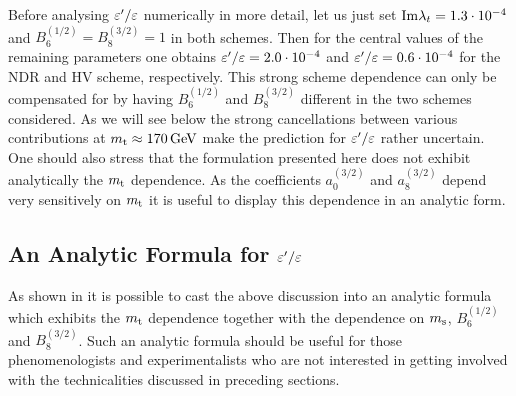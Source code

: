 Before analysing $\varepsilon'/\varepsilon$ numerically in more detail, let us just set
${\rm Im} \lambda_t = 1.3 \cdot 10^{-4}$ and $B_6^{(1/2)} = B_8^{(3/2)} = 1$
in both schemes. Then for the central values of the remaining
parameters one obtains $\varepsilon'/\varepsilon = 2.0 \cdot 10^{-4}$ and $\varepsilon'/\varepsilon = 0.6 \cdot
10^{-4}$ for the NDR and HV scheme, respectively. This strong scheme
dependence can only be compensated for by having $B_6^{(1/2)}$ and
$B_8^{(3/2)}$ different in the two schemes considered. As we will see
below the strong cancellations between various contributions at $m_{\rm t}
\approx 170\, {\rm GeV}$ make the prediction for $\varepsilon'/\varepsilon$ rather uncertain. One
should also stress that the formulation presented here does not exhibit
analytically the $m_{\rm t}$ dependence. As the coefficients $a_0^{(3/2)}$
and $a_8^{(3/2)}$ depend very sensitively on $m_{\rm t}$ it is useful to
display this dependence in an analytic form.

\subsection{An Analytic Formula for $\varepsilon'/\varepsilon$}
           \label{subsec:epeanalytic}
As shown in \cite{buraslauten:93} it is possible to cast the above
discussion into an analytic formula which exhibits the $m_{\rm t}$ dependence
together with the dependence on $m_{\rm s}$, $B_6^{(1/2)}$ and $B_8^{(3/2)}$.
Such an analytic formula should be useful for those phenomenologists
and experimentalists who are not interested in getting involved with
the technicalities discussed in preceding sections.

